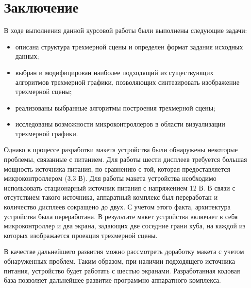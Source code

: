 \chapter*{Заключение}

В ходе выполнения данной курсовой работы были выполнены следующие задачи:
\begin{itemize}
    \item описана структура трехмерной сцены и определен формат задания исходных данных;
    \item выбран и модифицирован наиболее подходящий из существующих алгоритмов трехмерной графики, позволяющих синтезировать изображение трехмерной сцены;
    \item реализованы выбранные алгоритмы построения трехмерной сцены;
    \item исследованы возможности микроконтроллеров в области визуализации трехмерной графики.
\end{itemize}

Однако в процессе разработки макета устройства были обнаружены некоторые проблемы, связанные с питанием. Для работы шести дисплеев требуется большая мощность источника питания, по сравнению с той, которая предоставляется микроконтроллером (3.3 В). Для работы макета устройства необходимо использовать стационарный источник питания с напряжением 12 В. В связи с отсутствием такого источника, аппаратный комплекс был переработан и количество дисплеев сокращено до двух. С учетом этого факта, архитектура устройства была переработана. В результате макет устройства включает в себя микроконтроллер и два экрана, задающих две соседние грани куба, на каждой из которых изображается проекция трехмерной сцены.   

В качестве дальнейшего развития можно рассмотреть доработку макета с учетом обнаруженных проблем. Таким образом, при наличии подходящего источника питания, устройство будет работать с шестью экранами. Разработанная кодовая база позволяет дальнейшее развитие программно-аппаратного комплекса.

